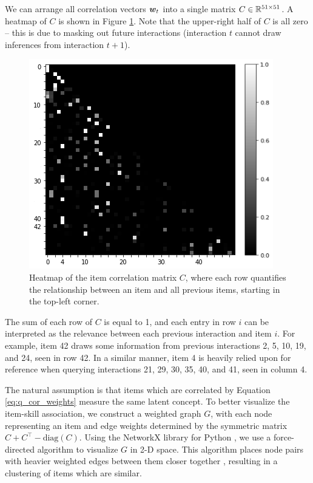 We can arrange all correlation vectors $\boldsymbol{w}_t$ into a single matrix $C \in \mathbb{R}^{51 \times 51}$. A heatmap of $C$ is shown in Figure \ref{fig:attn_item_cor}. Note that the upper-right half of $C$ is all zero -- this is due to masking out future interactions (interaction $t$ cannot draw inferences from interaction $t+1$).
\begin{figure}[h]
  \centering
  \includegraphics[width=.65\textwidth]{img/kt_irt/synth5_attn_weights_no_ffn_axis2.png}
  \caption{Heatmap of the item correlation matrix $C$, where each row quantifies the relationship between an item and all previous items, starting in the top-left corner.}
  \label{fig:attn_item_cor}
\end{figure}
The sum of each row of $C$ is equal to 1, and each entry in row $i$ can be interpreted as the relevance between each previous interaction and item $i$. For example, item 42 draws some information from previous interactions 2, 5, 10, 19, and 24, seen in row 42. In a similar manner, item 4 is heavily relied upon for reference when querying interactions 21, 29, 30, 35, 40, and 41, seen in column 4.

The natural assumption is that items which are correlated by Equation \ref{eq:q_cor_weights} measure the same latent concept. To better visualize the item-skill association, we construct a weighted graph $G$, with each node representing an item and edge weights determined by the symmetric matrix $C + C^\top - \text{diag}(C)$. Using the NetworkX library for Python \cite{networkx}, we use a force-directed algorithm to visualize $G$ in 2-D space. This algorithm places node pairs with heavier weighted edges between them closer together \cite{fruchterman1991}, resulting in a clustering of items which are similar.

